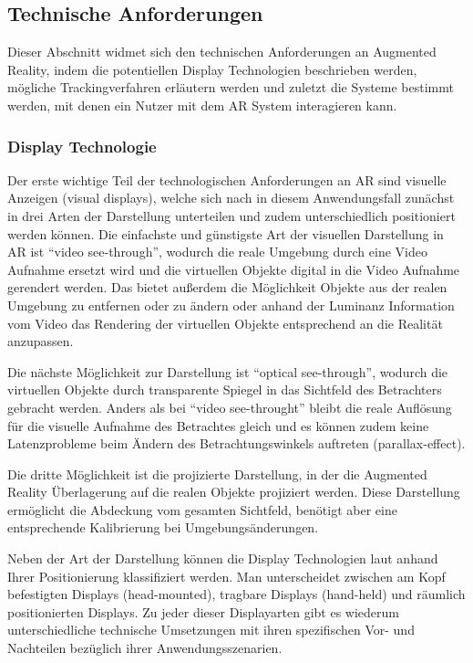 \subsection{Technische Anforderungen}

Dieser Abschnitt widmet sich den technischen Anforderungen an Augmented Reality, indem die potentiellen Display Technologien beschrieben werden, mögliche Trackingverfahren erläutern werden und zuletzt die Systeme bestimmt werden, mit denen ein Nutzer mit dem AR System interagieren kann.

\subsubsection{Display Technologie}

Der erste wichtige Teil der technologischen Anforderungen an AR sind visuelle Anzeigen (visual displays), welche sich nach \citet{van2010survey}
in diesem Anwendungsfall zunächst in drei Arten der Darstellung unterteilen und zudem unterschiedlich positioniert werden können. Die einfachste und günstigste Art der visuellen Darstellung in AR ist \enquote{video see-through}, wodurch die reale Umgebung durch eine Video Aufnahme ersetzt wird und die virtuellen Objekte digital in die Video Aufnahme gerendert werden. Das bietet außerdem die Möglichkeit Objekte aus der realen Umgebung zu entfernen oder zu ändern oder anhand der Luminanz Information vom Video das Rendering der virtuellen Objekte entsprechend an die Realität anzupassen.

Die nächste Möglichkeit zur Darstellung ist \enquote{optical see-through}, wodurch die virtuellen Objekte durch transparente Spiegel in das Sichtfeld des Betrachters gebracht werden. Anders als bei \enquote{video see-throught} bleibt die reale Auflösung für die visuelle Aufnahme des Betrachtes gleich und es können zudem keine Latenzprobleme beim Ändern des Betrachtungswinkels auftreten (parallax-effect).

Die dritte Möglichkeit ist die projizierte Darstellung, in der die Augmented Reality Überlagerung auf die realen Objekte projiziert werden. Diese Darstellung ermöglicht die Abdeckung vom gesamten Sichtfeld, benötigt aber eine entsprechende Kalibrierung bei Umgebungsänderungen.

Neben der Art der Darstellung können die Display Technologien laut \citet{azuma2001recent} anhand Ihrer Positionierung klassifiziert werden. Man unterscheidet zwischen am Kopf befestigten Displays (head-mounted), tragbare Displays  (hand-held) und räumlich positionierten Displays. Zu jeder dieser Displayarten gibt es wiederum unterschiedliche technische Umsetzungen mit ihren spezifischen Vor- und Nachteilen bezüglich ihrer Anwendungsszenarien.

